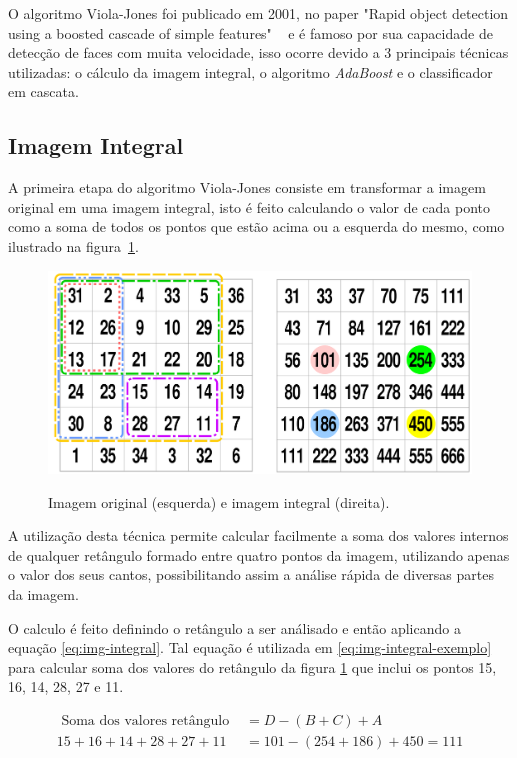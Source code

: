 O algoritmo Viola-Jones foi publicado em 2001, no paper "Rapid object detection using a boosted cascade of simple features" ~\cite{paper-viola-jones} e é famoso por sua capacidade de detecção de faces com muita velocidade, isso ocorre devido a 3 principais técnicas utilizadas: o cálculo da imagem integral, o algoritmo \textit{AdaBoost} e o classificador em cascata.

\subsection{Imagem Integral} 

A primeira etapa do algoritmo Viola-Jones consiste em transformar a imagem original em uma imagem integral, isto é feito calculando o valor de cada ponto como a soma de todos os pontos que estão acima ou a esquerda do mesmo, como ilustrado na figura~\ref{fig:integral}.

\begin{figure}[htpb]
    \centering
    \caption{Imagem original (esquerda) e imagem integral (direita).}
    \includegraphics[scale=.3]{figs/imagem-integral.png}
    \label{fig:integral}
 \end{figure}

A utilização desta técnica permite calcular facilmente a soma dos valores internos de qualquer retângulo formado entre quatro pontos da imagem, utilizando apenas o valor dos seus cantos, possibilitando assim a análise rápida de diversas partes da imagem.

O calculo é feito definindo o retângulo a ser análisado e então aplicando a equação \ref{eq:img-integral}. Tal equação é utilizada em \ref{eq:img-integral-exemplo} para calcular soma dos valores do retângulo da figura \ref{fig:integral} que inclui os pontos 15, 16, 14, 28, 27 e 11.

\begin{align}\label{eq:img-integral}
    \text{ Soma dos valores retângulo } &= D - (B + C) + A \\
    \label{eq:img-integral-exemplo}
    15 + 16 + 14 + 28 + 27 + 11 &= 101 - (254 + 186) + 450 = 111
\end{align}

